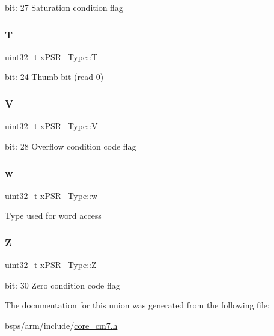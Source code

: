 bit\+: 27 Saturation condition flag \mbox{\label{unionxPSR__Type_a7eed9fe24ae8d354cd76ae1c1110a658}} 
\subsubsection{\texorpdfstring{T}{T}}
{\footnotesize\ttfamily uint32\+\_\+t x\+P\+S\+R\+\_\+\+Type\+::T}

bit\+: 24 Thumb bit (read 0) \mbox{\label{unionxPSR__Type_af14df16ea0690070c45b95f2116b7a0a}} 
\subsubsection{\texorpdfstring{V}{V}}
{\footnotesize\ttfamily uint32\+\_\+t x\+P\+S\+R\+\_\+\+Type\+::V}

bit\+: 28 Overflow condition code flag \mbox{\label{unionxPSR__Type_a1a47176768f45f79076c4f5b1b534bc2}} 
\subsubsection{\texorpdfstring{w}{w}}
{\footnotesize\ttfamily uint32\+\_\+t x\+P\+S\+R\+\_\+\+Type\+::w}

Type used for word access \mbox{\label{unionxPSR__Type_a1e5d9801013d5146f2e02d9b7b3da562}} 
\subsubsection{\texorpdfstring{Z}{Z}}
{\footnotesize\ttfamily uint32\+\_\+t x\+P\+S\+R\+\_\+\+Type\+::Z}

bit\+: 30 Zero condition code flag 

The documentation for this union was generated from the following file\+:\begin{DoxyCompactItemize}
\item 
bsps/arm/include/\mbox{\hyperlink{core__cm7_8h}{core\+\_\+cm7.\+h}}\end{DoxyCompactItemize}
